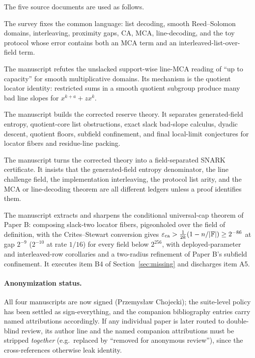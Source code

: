 \documentclass[11pt]{article}
\theoremstyle{definition}
\theoremstyle{remark}
\newcommand{\F}{\mathbb F}
\newcommand{\eca}{\varepsilon_{\rm ca}}
\newcommand{\paperA}{Paper A}
\newcommand{\paperB}{Paper B}
\newcommand{\paperC}{Paper C}
\newcommand{\paperD}{Paper D}
\begin{document}
The five source documents are used as follows.
\begin{description}[leftmargin=3.5cm,style=nextline]
\item[Survey ABF26.] The survey \cite{ABF26} fixes the common language: list decoding, smooth Reed--Solomon domains, interleaving, proximity gaps, CA, MCA, line-decoding, and the toy protocol whose error contains both an MCA term and an interleaved-list-over-field term.
\item[\paperA: no-slack obstruction.] The manuscript \cite{NoSlack} refutes the unslacked support-wise line-MCA reading of ``up to capacity'' for smooth multiplicative domains.  Its mechanism is the quotient locator identity: restricted sums in a smooth quotient subgroup produce many bad line slopes for $x^{k+a}+zx^k$.
\item[\paperB: slack and entropy theory.] The manuscript \cite{SlackEntropy} builds the corrected reserve theory.  It separates generated-field entropy, quotient-core list obstructions, exact slack bad-slope calculus, dyadic descent, quotient floors, subfield confinement, and final local-limit conjectures for locator fibers and residue-line packing.
\item[\paperC: protocol ledger.] The manuscript \cite{SNARKLedger} turns the corrected theory into a field-separated SNARK certificate.  It insists that the generated-field entropy denominator, the line challenge field, the implementation interleaving, the protocol list arity, and the MCA or line-decoding theorem are all different ledgers unless a proof identifies them.
\item[\paperD: universal cap.] The manuscript \cite{UniversalCap} extracts and sharpens the conditional universal-cap theorem of \paperB: composing slack-two locator fibers, pigeonholed over the field of definition, with the Crites--Stewart conversion gives $\eca>\frac1{2k}(1-n/|\F|)\ge2^{-86}$ at gap $2^{-9}$ ($2^{-10}$ at rate $1/16$) for every field below $2^{256}$, with deployed-parameter and interleaved-row corollaries and a two-radius refinement of \paperB's subfield confinement.  It executes item B4 of Section~\ref{sec:missing} and discharges item A5.
\end{description}

\paragraph{Anonymization status.}  All four manuscripts are now signed (Przemys\l{}aw Chojecki); the suite-level policy has been settled as sign-everything, and the companion bibliography entries carry named attributions accordingly.  If any individual paper is later routed to double-blind review, its author line and the named companion attributions must be stripped \emph{together} (e.g.\ replaced by ``removed for anonymous review''), since the cross-references otherwise leak identity.
\end{document}
